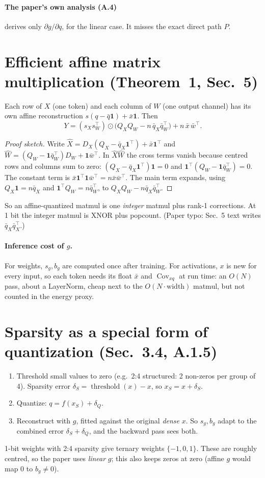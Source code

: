 \documentclass[11pt]{article}
\newcommand{\one}{\mathbf 1}
\newcommand{\Cov}{\operatorname{Cov}}
\begin{document}
\paragraph{The paper's own analysis (A.4)} derives only $\partial g/\partial q$, for the linear case. It misses the exact direct path $P$.

\section{Efficient affine matrix multiplication (Theorem~1, Sec.~5)}

Each row of $X$ (one token) and each column of $W$ (one output channel) has its own affine reconstruction $s(q-\bar q\one)+\bar x\one$. Then
\[
\boxed{Y=(s_Xs_W^\top)\odot\big(Q_XQ_W-n\,\bar q_X\bar q_W^\top\big)+n\,\bar x\,\bar w^\top.}
\]
\begin{proof}[Proof sketch]
Write $\hat X=D_X(Q_X-\bar q_X\one^\top)+\bar x\one^\top$ and $\hat W=(Q_W-\one\bar q_W^\top)D_W+\one\bar w^\top$. In $\hat X\hat W$ the cross terms vanish because centred rows and columns sum to zero: $(Q_X-\bar q_X\one^\top)\one=0$ and $\one^\top(Q_W-\one\bar q_W^\top)=0$. The constant term is $\bar x\one^\top\one\bar w^\top=n\bar x\bar w^\top$. The main term expands, using $Q_X\one=n\bar q_X$ and $\one^\top Q_W=n\bar q_W^\top$, to $Q_XQ_W-n\bar q_X\bar q_W^\top$.
\end{proof}
So an affine-quantized matmul is one \emph{integer} matmul plus rank-1 corrections. At 1 bit the integer matmul is XNOR plus popcount. (Paper typo: Sec.~5 text writes $\bar q_X\bar q_X^\top$.)

\paragraph{Inference cost of $g$.} For weights, $s_g,b_g$ are computed once after training. For activations, $x$ is new for every input, so each token needs its float $\bar x$ and $\Cov_{xq}$ at run time: an $O(N)$ pass, about a LayerNorm, cheap next to the $O(N\cdot\text{width})$ matmul, but not counted in the energy proxy.

\section{Sparsity as a special form of quantization (Sec.~3.4, A.1.5)}

\begin{enumerate}
\item Threshold small values to zero (e.g.\ 2:4 structured: 2 non-zeros per group of 4). Sparsity error $\delta_S=\operatorname{threshold}(x)-x$, so $x_S=x+\delta_S$.
\item Quantize: $q=f(x_S)+\delta_Q$.
\item Reconstruct with $g$, fitted against the original \emph{dense} $x$. So $s_g,b_g$ adapt to the combined error $\delta_S+\delta_Q$, and the backward pass sees both.
\end{enumerate}
1-bit weights with 2:4 sparsity give ternary weights $\{-1,0,1\}$. These are roughly centred, so the paper uses \emph{linear} $g$; this also keeps zeros at zero (affine $g$ would map 0 to $b_g\neq0$).
\end{document}
